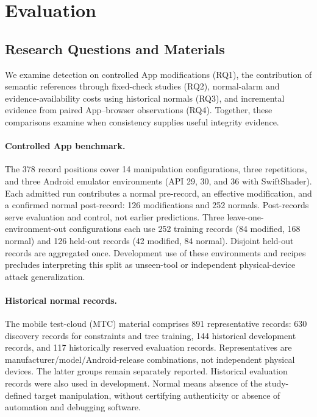 \section{Evaluation}
\label{sec:eval}
\subsection{Research Questions and Materials}
We examine detection on controlled App modifications (RQ1), the contribution of semantic references through fixed-check studies (RQ2), normal-alarm and evidence-availability costs using historical normals (RQ3), and incremental evidence from paired App--browser observations (RQ4). Together, these comparisons examine when consistency supplies useful integrity evidence.

\paragraph{Controlled App benchmark.}
The 378 record positions cover 14 manipulation configurations, three repetitions, and three Android emulator environments (API 29, 30, and 36 with SwiftShader). Each admitted run contributes a normal pre-record, an effective modification, and a confirmed normal post-record: 126 modifications and 252 normals. Post-records serve evaluation and control, not earlier predictions. Three leave-one-environment-out configurations each use 252 training records (84 modified, 168 normal) and 126 held-out records (42 modified, 84 normal). Disjoint held-out records are aggregated once. Development use of these environments and recipes precludes interpreting this split as unseen-tool or independent physical-device attack generalization.

\paragraph{Historical normal records.}
The mobile test-cloud (MTC) material comprises 891 representative records: 630 discovery records for constraints and tree training, 144 historical development records, and 117 historically reserved evaluation records. Representatives are manufacturer/model/Android-release combinations, not independent physical devices. The latter groups remain separately reported. Historical evaluation records were also used in development. Normal means absence of the study-defined target manipulation, without certifying authenticity or absence of automation and debugging software.

